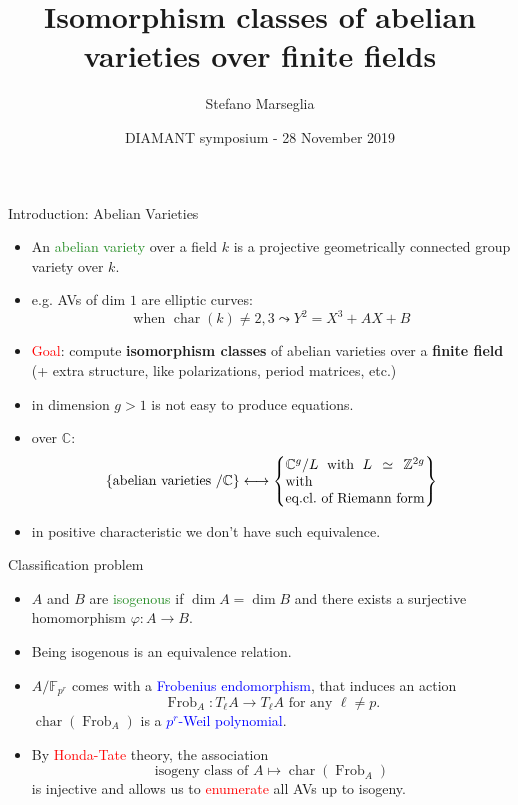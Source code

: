 \documentclass[usenames,dvipsnames,handout]{beamer}
\title[]{Isomorphism classes of abelian varieties over finite fields}
\subtitle{}
\author[Marseglia Stefano]{Stefano Marseglia}
\institute[]{Utrecht University}
\date[28 November 2019]{DIAMANT symposium - 28 November 2019}
\def\Z{\mathbb{Z}}
\def\C{\mathbb{C}}
\def\F{\mathbb{F}}
\DeclareMathOperator{\Char}{char}
\DeclareMathOperator{\Frob}{Frob}
\newcommand{\set}[1]{\left\lbrace#1\right\rbrace }
\newcommand{\red}[1]{\textcolor{red}{#1}}
\newcommand{\blue}[1]{\textcolor{blue}{#1}}
\newcommand{\green}[1]{\textcolor{ForestGreen}{#1}}
\begin{document}
\begin{frame}
\titlepage
\end{frame}

\begin{frame}{ Introduction: Abelian Varieties }
\begin{itemize}
 \item An \green{abelian variety} over a field $k$ is a projective geometrically connected group variety over $k$.
 \pause \item e.g. AVs of dim $1$ are elliptic curves:
 \[\text{when }\Char(k)\neq 2,3 \leadsto Y^2=X^3+AX+B  \]
 \vspace{-2em}\pause \item \red{Goal}: compute \textbf{isomorphism classes} of abelian varieties over a \textbf{finite field} (+ extra structure, like polarizations, period matrices, etc.)
 \pause \item in dimension $g>1$ is not easy to produce equations.
 \pause \item over $\C$:
 \[
      \set{ \text{abelian varieties $/\C$} } \longleftrightarrow 
      \set{\parbox[c]{10em}{$\C^g/L$ with $L\simeq \Z^{2g}$ with\\eq.cl.~of Riemann form}}
 \]
 \pause \vspace{-6mm} \item in positive characteristic we don't have such equivalence.
\end{itemize}
\end{frame}

\begin{frame}{ Classification problem }
	\begin{itemize}
		\item $A$ and $B$ are \green{isogenous} if $\dim A=\dim B$ and there exists a surjective homomorphism $\varphi:A\to B$.
		\pause \item Being isogenous is an equivalence relation.
		\pause \item $A/\F_{p^r}$ comes with a \blue{Frobenius endomorphism}, that induces an action
		\[ \Frob_A : T_\ell A \rightarrow T_\ell A \text{ for any }\ell\neq p. \]
		$\Char(\Frob_A)$ is a \blue{$p^r$-Weil polynomial}.
		\pause \item By \red{Honda-Tate} theory, the association
		\[ \text{isogeny class of }A \mapsto \Char(\Frob_A)\]
		is injective and allows us to \red{enumerate} all AVs up to isogeny.
	\end{itemize}
\end{frame}
\end{document}
